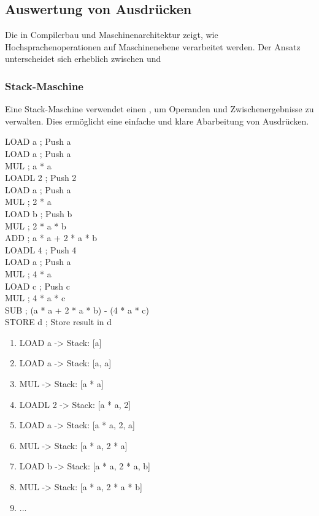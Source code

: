 \subsection{Auswertung von Ausdrücken}
Die  in Compilerbau und Maschinenarchitektur zeigt, wie Hochsprachenoperationen auf Maschinenebene verarbeitet werden. Der Ansatz unterscheidet sich erheblich zwischen  und 
\subsubsection{Stack-Maschine}
Eine Stack-Maschine verwendet einen , um Operanden und Zwischenergebnisse zu verwalten. Dies ermöglicht eine einfache und klare Abarbeitung von Ausdrücken.\\
\begin{defBox}
    LOAD  a       ; Push a\\
    LOAD  a       ; Push a\\
    MUL           ; a * a\\
    LOADL 2       ; Push 2\\
    LOAD  a       ; Push a\\
    MUL           ; 2 * a\\
    LOAD  b       ; Push b\\
    MUL           ; 2 * a * b\\
    ADD           ; a * a + 2 * a * b\\
    LOADL 4       ; Push 4\\
    LOAD  a       ; Push a\\
    MUL           ; 4 * a\\
    LOAD  c       ; Push c\\
    MUL           ; 4 * a * c\\
    SUB           ; (a * a + 2 * a * b) - (4 * a * c)\\
    STORE d       ; Store result in d
\end{defBox}
\begin{enumerate}
    \item LOAD a -> Stack: [a]
    \item LOAD a -> Stack: [a, a]
    \item MUL -> Stack: [a * a]
    \item LOADL 2 -> Stack: [a * a, 2]
    \item LOAD a -> Stack: [a * a, 2, a]
    \item MUL -> Stack: [a * a, 2 * a]
    \item LOAD b -> Stack: [a * a, 2 * a, b]
    \item MUL -> Stack: [a * a, 2 * a * b]
    \item ...
\end{enumerate}
